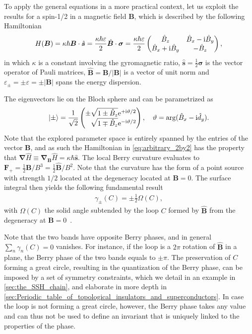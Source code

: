 To apply the general equations in a more practical context, let us exploit the results for a spin-1/2 in a magnetic field $\bm B$, which is described by the following Hamiltonian
\begin{align}
    H(\bm B) = \kappa\hbar\bm B\cdot\hat{\bm s} = \frac{\kappa\hbar\varepsilon}2 \hat{\bm B}\cdot\bm\sigma
    =
    \frac{\kappa\hbar\varepsilon}2
    \begin{pmatrix}
        \hat{B}_z & \hat{B}_x - \mathrm i \hat{B}_y \\
        \hat{B}_x + \mathrm i \hat{B}_y & -\hat{B}_z
    \end{pmatrix},
    \label{eq:arbitrary_2by2}
\end{align}
in which $\kappa$ is a constant involving the gyromagnetic ratio, $\hat{\bm s} = \frac12{\bm \sigma}$ is the vector operator of Pauli matrices, $\hat{\bm B}={\bm B}/|\bm B|$ is a vector of unit norm and $\varepsilon_\pm = \pm\varepsilon = \pm|\bm B|$ spans the energy dispersion.

The eigenvectors lie on the Bloch sphere and can be parametrized as
\begin{align}
    \ket{\pm} = \frac{1}{\sqrt{2}}
    \begin{pmatrix}
        \pm \sqrt{1 \pm \hat{B}_z}\re^{+\ri\vartheta/2}\\
        \phantom\pm\sqrt{1 \mp \hat{B}_z}\re^{-\ri\vartheta/2}
    \end{pmatrix}
    ,
    \quad
    \vartheta = \arg(\hat{B}_x-\ri \hat{d}_y).
\end{align}
Note that the explored parameter space is entirely spanned by the entries of the vector $\bm B$, and as such the Hamiltonian in \cref{eq:arbitrary_2by2} has the property that $\bm\nabla\hat H \equiv \bm\nabla_{\bm B}\hat H = \kappa\hbar\hat{\bm s}$.
The local Berry curvature evaluates to ${\bm F}_+ = \frac12\bm B/B^3=\frac12\hat{\bm B}/B^2$.
Note that the curvature has the form of a point source with strength $1/2$ located at the degeneracy located at $\bm B=0$.
The surface integral then yields the following fundamental result
\begin{align}
    \gamma_{\pm}(C) = \pm\frac12\Omega(C),
\end{align}
with $\Omega(C)$ the solid angle subtended by the loop $C$ formed by $\hat {\bm B}$ from the degeneracy at $\bm B=0$~\cite{Berry1984}.

Note that the two bands have opposite Berry phases, and in general $\sum_n\gamma_n(C)=0$ vanishes.
For instance, if the loop is a $2\pi$ rotation of $\hat{\bm B}$ in a plane, the Berry phase of the two bands equals to $\pm\pi$.
The preservation of $C$ forming a great circle, resulting in the quantization of the Berry phase, can be imposed by a set of symmetry constraints, which we detail in an example in \cref{sec:the_SSH_chain}, and elaborate in more depth in \cref{sec:Periodic_table_of_topological_insulators_and_superconductors}.
In case the loop is not forming a great circle, however, the Berry phase takes any value and can thus not be used to define an invariant that is uniquely linked to the properties of the phase.

